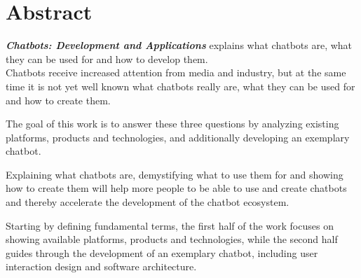 \chapter*{Abstract}

\emph{\textbf{Chatbots: Development and Applications}} explains what chatbots are, what they can be used for and how to develop them.
\\

Chatbots receive increased attention from media and industry,
but at the same time it is not yet well known what chatbots really are, what they can be used for and how to create them.

The goal of this work is to answer these three questions by analyzing existing platforms, products and technologies,
and additionally developing an exemplary chatbot.

Explaining what chatbots are, demystifying what to use them for and showing how to create them
will help more people to be able to use and create chatbots and thereby accelerate the development of the chatbot ecosystem.

Starting by defining fundamental terms,
the first half of the work focuses on showing available platforms, products and technologies,
while the second half guides through the development of an exemplary chatbot, including user interaction design and software architecture.
